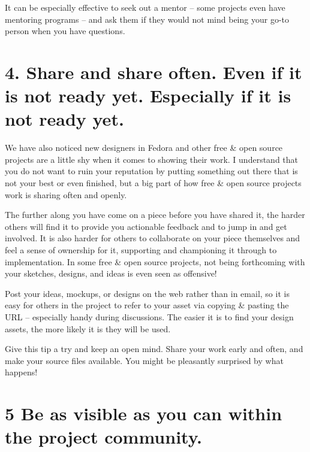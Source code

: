 It can be especially effective to seek out a mentor -- some projects even have
mentoring programs -- and ask them if they would not mind being your go-to person
when you have questions. 

\section*{4. Share and share often. Even if it is not ready yet. Especially if it
is not ready yet.}

We have also noticed new designers in Fedora and other free \& open source projects
are a little shy when it comes to showing their work. I understand that you
do not want to ruin your reputation by putting something out there that is not
your best or even finished, but a big part of how free \& open source projects
work is sharing often and openly. 

The further along you have come on a piece before you have shared it, the harder
others will find it to provide you actionable feedback and to jump in and get
involved. It is also harder for others to collaborate on your piece themselves
and feel a sense of ownership for it, supporting and championing it through to
implementation. In some free \& open source projects, not being forthcoming with
your sketches, designs, and ideas is even seen as offensive! 

Post your ideas, mockups, or designs on the web rather than in email, so it is
easy for others in the project to refer to your asset via copying \& pasting the
URL -- especially handy during discussions. The easier it is to find your design
assets, the more likely it is they will be used. 

Give this tip a try and keep an open mind. Share your work early and often, and
make your source files available. You might be pleasantly surprised by what
happens!

\section*{5 Be as visible as you can within the project community.}

